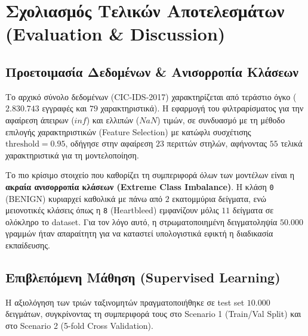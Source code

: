 \documentclass[11pt,a4paper]{article}
\begin{document}
	\newpage
	\section{Σχολιασμός Τελικών Αποτελεσμάτων (Evaluation \& Discussion)}
	
	\subsection{Προετοιμασία Δεδομένων \& Ανισορροπία Κλάσεων}
	Το αρχικό σύνολο δεδομένων (CIC-IDS-2017) χαρακτηρίζεται από τεράστιο όγκο ($2.830.743$ εγγραφές και $79$ χαρακτηριστικά). Η εφαρμογή του φιλτραρίσματος για την αφαίρεση άπειρων ($inf$) και ελλιπών ($NaN$) τιμών, σε συνδυασμό με τη μέθοδο επιλογής χαρακτηριστικών (Feature Selection) με κατώφλι συσχέτισης $\text{threshold} = 0.95$, οδήγησε στην αφαίρεση $23$ περιττών στηλών, αφήνοντας $55$ τελικά χαρακτηριστικά για τη μοντελοποίηση.
	
	Το πιο κρίσιμο στοιχείο που καθορίζει τη συμπεριφορά όλων των μοντέλων είναι η \textbf{ακραία ανισορροπία κλάσεων (Extreme Class Imbalance)}. Η κλάση \texttt{0} (BENIGN) κυριαρχεί καθολικά με πάνω από $2$ εκατομμύρια δείγματα, ενώ μειονοτικές κλάσεις όπως η \texttt{8} (Heartbleed) εμφανίζουν μόλις $11$ δείγματα σε ολόκληρο το dataset. Για τον λόγο αυτό, η στρωματοποιημένη δειγματοληψία $50.000$ γραμμών ήταν απαραίτητη για να καταστεί υπολογιστικά εφικτή η διαδικασία εκπαίδευσης.
	
	\subsection{Επιβλεπόμενη Μάθηση (Supervised Learning)}
	Η αξιολόγηση των τριών ταξινομητών πραγματοποιήθηκε σε test set $10.000$ δειγμάτων, συγκρίνοντας τη συμπεριφορά τους στο Scenario 1 (Train/Val Split) και στο Scenario 2 (5-fold Cross Validation).
	
\end{document}
